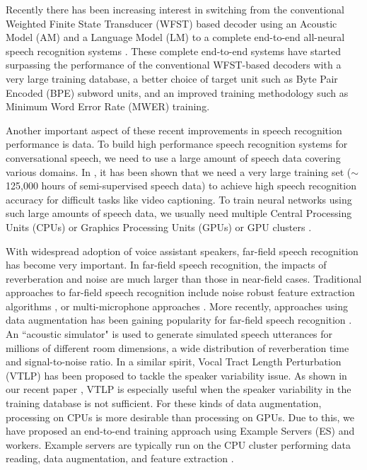 \documentclass[a4paper]{article}
\begin{document}
Recently there has been increasing interest in switching
from the conventional Weighted Finite State Transducer (WFST)
based decoder using an Acoustic Model (AM) and a Language Model (LM)
to a complete end-to-end all-neural speech recognition systems 
\cite{w_chan_icassp_2016_00, r_prabhavalkar_interspeech_2017_00, 
j_chorowski_nips_2015_00}. 
These complete end-to-end systems have started surpassing the performance of
the conventional WFST-based decoders with a very large training 
database, a better choice of target unit such as Byte Pair Encoded (BPE) 
subword units, and an improved training methodology such as Minimum
Word Error Rate (MWER) training.

Another important aspect of these recent improvements in speech
recognition performance is data. 
To build high performance speech recognition systems for
conversational speech, we need to use
a large amount of speech data covering various domains. In
\cite{h_soltau_interspeech_2017_00}, it has been shown
that we need a very large training set ($\sim$125,000 hours of 
semi-supervised speech data) to achieve
high speech recognition accuracy for difficult tasks like 
video captioning. To train neural networks using such large 
amounts of speech data, we usually need 
multiple Central Processing Units (CPUs) or Graphics
Processing Units (GPUs) or GPU clusters 
\cite{E_Variani_INTERSPEECH_2017_01, p_goyal_arxiv_2018_00}.

With widespread adoption of voice assistant speakers, far-field
speech recognition has become very important.
In far-field speech recognition, the impacts of reverberation and noise 
are much larger than those in near-field cases. 
Traditional approaches to far-field
speech recognition include noise robust feature extraction algorithms
\cite{C_Kim_IEEETran_2016_1, U_H_Yapanel_SpeechComm_2008},
or multi-microphone approaches
\cite{T_Nekatani_ICASSP_2017_1, T_Higuchi_ICASSP_2016_1,
H_Erdogan_INTERSPEECH_2016_1,
C_Kim_INTERSPEECH_2010_1, C_Kim_ICASSP_2012_2}.
More recently, approaches using data augmentation
has been gaining popularity for far-field speech recognition
\cite{R_Lippmann_icassp_1987_1,
c_kim_interspeech_2018_00, w_hartmann_interspeech_2016_00}. 
An ``acoustic simulator"  
\cite{C_Kim_INTERSPEECH_2017_1, c_kim_interspeech_2018_00}
is used to generate simulated speech utterances for
millions of different room dimensions, a wide distribution
of reverberation time and signal-to-noise ratio. In a similar 
spirit, Vocal Tract Length Perturbation (VTLP) has been proposed 
\cite{n_jaitly_icml_workshop_2013_00} to tackle the speaker variability issue.
As shown in our recent paper \cite{c_kim_interspeech_2019_00}, 
VTLP is especially useful when
the speaker variability in the training database is not sufficient. 
For these kinds of data augmentation, processing on CPUs is more
desirable than processing on GPUs. Due to this, we have proposed
an end-to-end training approach using Example Servers (ES)
 and workers. Example servers are typically run on the CPU
cluster performing data reading, data augmentation, and feature extraction
\cite{c_kim_interspeech_2018_00}.
\end{document}
